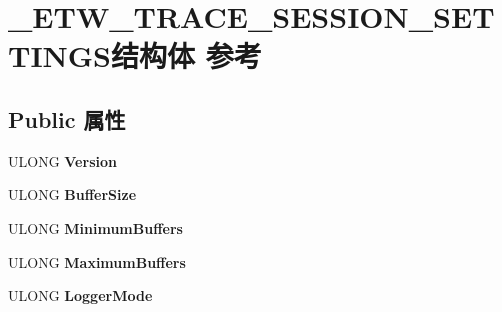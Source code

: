 \hypertarget{struct___e_t_w___t_r_a_c_e___s_e_s_s_i_o_n___s_e_t_t_i_n_g_s}{}\section{\+\_\+\+E\+T\+W\+\_\+\+T\+R\+A\+C\+E\+\_\+\+S\+E\+S\+S\+I\+O\+N\+\_\+\+S\+E\+T\+T\+I\+N\+G\+S结构体 参考}
\label{struct___e_t_w___t_r_a_c_e___s_e_s_s_i_o_n___s_e_t_t_i_n_g_s}
\subsection*{Public 属性}
\begin{DoxyCompactItemize}
\item 
\mbox{\label{struct___e_t_w___t_r_a_c_e___s_e_s_s_i_o_n___s_e_t_t_i_n_g_s_a6afdb4c51c74606101891c11714611a7}} 
U\+L\+O\+NG {\bfseries Version}
\item 
\mbox{\label{struct___e_t_w___t_r_a_c_e___s_e_s_s_i_o_n___s_e_t_t_i_n_g_s_a99326b2a4b327e73b59782317ffd9850}} 
U\+L\+O\+NG {\bfseries Buffer\+Size}
\item 
\mbox{\label{struct___e_t_w___t_r_a_c_e___s_e_s_s_i_o_n___s_e_t_t_i_n_g_s_aa4399f848c0236e25e0b50791417518b}} 
U\+L\+O\+NG {\bfseries Minimum\+Buffers}
\item 
\mbox{\label{struct___e_t_w___t_r_a_c_e___s_e_s_s_i_o_n___s_e_t_t_i_n_g_s_a825961745b1e9a06ad0d62b35c759190}} 
U\+L\+O\+NG {\bfseries Maximum\+Buffers}
\item 
\mbox{\label{struct___e_t_w___t_r_a_c_e___s_e_s_s_i_o_n___s_e_t_t_i_n_g_s_a572cf99c0aeb9e9fe143292733dbb712}} 
U\+L\+O\+NG {\bfseries Logger\+Mode}
\item 
\mbox{\label{struct___e_t_w___t_r_a_c_e___s_e_s_s_i_o_n___s_e_t_t_i_n_g_s_a750138f437cb1f4ed9414b5c3acba4d7}} 

\end{DoxyCompactItemize}

